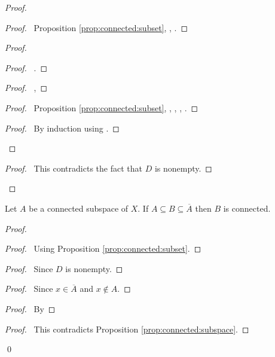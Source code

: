 \begin{proof}
  \pf
  \begin{proof}
    \pf\ Proposition \ref{prop:connected:subset}, , .
  \end{proof}
  \begin{proof}
    \begin{proof}
      \pf\ .
    \end{proof}
    \begin{proof}
      \pf\ , 
    \end{proof}
    \begin{proof}
      \pf\ Proposition \ref{prop:connected:subset}, , , , .
    \end{proof}
    \qedstep
    \begin{proof}
      \pf\ By induction using .
    \end{proof}
  \end{proof}
  \qedstep
  \begin{proof}
    \pf\ This contradicts the fact that $D$ is nonempty.
  \end{proof}
\end{proof}

\begin{prop}
  \label{prop:connected:closure}
  Let $A$ be a connected subspace of $X$. If $A \subseteq B \subseteq \overline{A}$ then $B$ is connected.
\end{prop}

\begin{proof}
  \pf
  \begin{proof}
    \pf\ Using Proposition \ref{prop:connected:subset}.
  \end{proof}
  \begin{proof}
    \pf\ Since $D$ is nonempty.
  \end{proof}
  \begin{proof}
    \pf\ Since $x \in \overline{A}$ and $x \notin A$.
  \end{proof}
  \begin{proof}
    \pf\ By 
  \end{proof}
  \qedstep
  \begin{proof}
    \pf\ This contradicts Proposition \ref{prop:connected:subspace}.
  \end{proof}
  \qed
\end{proof}

